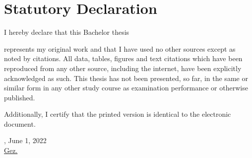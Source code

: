 \chapter*{Statutory Declaration}

I hereby declare that this Bachelor thesis 

\begin{quote}
	\textit{\titel}
\end{quote} 

represents my original work and that I have used no other sources except as noted by citations. All data, tables, figures and text citations which have been reproduced from any other source, including the internet, have been explicitly acknowledged as such. This thesis has not been presented, so far, in the same or similar form in any other study course as examination performance or otherwise published.

Additionally, I certify that the printed version is identical to the electronic document.

\vspace{1cm}

\verfassungsort, June 1, 2022 \\[0.5cm]
	{\underline{Gez. \autor}}
	{\makebox[6cm]{\hrulefill}}\\ 
\autorReverse
